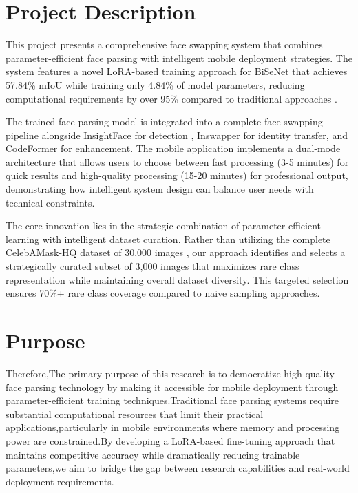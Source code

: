 \documentclass[12pt,a4paper]{report}
\begin{document}
\section{Project Description}

This project presents a comprehensive face swapping system that combines parameter-efficient face parsing with intelligent mobile deployment strategies. The system features a novel LoRA-based training approach for BiSeNet that achieves 57.84\% mIoU while training only 4.84\% of model parameters, reducing computational requirements by over 95\% compared to traditional approaches \cite{simonyan2014very}.

The trained face parsing model is integrated into a complete face swapping pipeline alongside InsightFace for detection \cite{deng2019arcface}, Inswapper for identity transfer, and CodeFormer for enhancement. The mobile application implements a dual-mode architecture that allows users to choose between fast processing (3-5 minutes) for quick results and high-quality processing (15-20 minutes) for professional output, demonstrating how intelligent system design can balance user needs with technical constraints.

The core innovation lies in the strategic combination of parameter-efficient learning with intelligent dataset curation. Rather than utilizing the complete CelebAMask-HQ dataset of 30,000 images \cite{lee2020maskgan}, our approach identifies and selects a strategically curated subset of 3,000 images that maximizes rare class representation while maintaining overall dataset diversity. This targeted selection ensures 70\%+ rare class coverage compared to naive sampling approaches.

\section{Purpose}

Therefore,The primary purpose of this research is to democratize high-quality face parsing technology by making it accessible for mobile deployment through parameter-efficient training techniques.Traditional face parsing systems require substantial computational resources that limit their practical applications,particularly in mobile environments where memory and processing power are constrained.By developing a LoRA-based fine-tuning approach that maintains competitive accuracy while dramatically reducing trainable parameters,we aim to bridge the gap between research capabilities and real-world deployment requirements.
\end{document}
